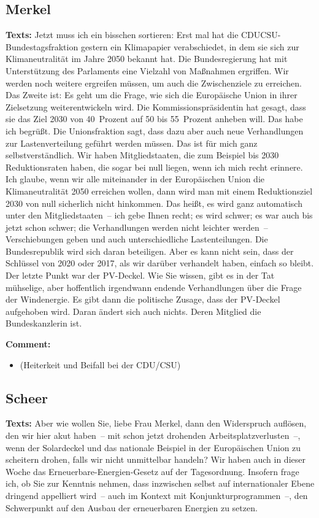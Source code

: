 \documentclass{article}
\begin{document}
\subsection{Merkel}
\noindent\textbf{Texts:} Jetzt muss ich ein bisschen sortieren: Erst mal hat die CDU\/CSU-Bundestagsfraktion gestern ein Klimapapier verabschiedet, in dem sie sich zur Klimaneutralität im Jahre 2050 bekannt hat. Die Bundesregierung hat mit Unterstützung des Parlaments eine Vielzahl von Maßnahmen ergriffen. Wir werden noch weitere ergreifen müssen, um auch die Zwischenziele zu erreichen. Das Zweite ist: Es geht um die Frage, wie sich die Europäische Union in ihrer Zielsetzung weiterentwickeln wird. Die Kommissionspräsidentin hat gesagt, dass sie das Ziel 2030 von 40 Prozent auf 50 bis 55 Prozent anheben will. Das habe ich begrüßt. Die Unionsfraktion sagt, dass dazu aber auch neue Verhandlungen zur Lastenverteilung geführt werden müssen. Das ist für mich ganz selbstverständlich. Wir haben Mitgliedstaaten, die zum Beispiel bis 2030 Reduktionsraten haben, die sogar bei null liegen, wenn ich mich recht erinnere. Ich glaube, wenn wir alle miteinander in der Europäischen Union die Klimaneutralität 2050 erreichen wollen, dann wird man mit einem Reduktionsziel 2030 von null sicherlich nicht hinkommen. Das heißt, es wird ganz automatisch unter den Mitgliedstaaten – ich gebe Ihnen recht; es wird schwer; es war auch bis jetzt schon schwer; die Verhandlungen werden nicht leichter werden – Verschiebungen geben und auch unterschiedliche Lastenteilungen. Die Bundesrepublik wird sich daran beteiligen. Aber es kann nicht sein, dass der Schlüssel von 2020 oder 2017, als wir darüber verhandelt haben, einfach so bleibt. Der letzte Punkt war der PV-Deckel. Wie Sie wissen, gibt es in der Tat mühselige, aber hoffentlich irgendwann endende Verhandlungen über die Frage der Windenergie. Es gibt dann die politische Zusage, dass der PV-Deckel aufgehoben wird. Daran ändert sich auch nichts. Deren Mitglied die Bundeskanzlerin ist. 

\noindent\textbf{Comment:}
\begin{itemize}
    \setlength\itemsep{-3pt}
    \item (Heiterkeit und Beifall bei der CDU/CSU)
\end{itemize}
\subsection{Scheer}
\noindent\textbf{Texts:} Aber wie wollen Sie, liebe Frau Merkel, dann den Widerspruch auflösen, den wir hier akut haben – mit schon jetzt drohenden Arbeitsplatzverlusten –, wenn der Solardeckel und das nationale Beispiel in der Europäischen Union zu scheitern drohen, falls wir nicht unmittelbar handeln? Wir haben auch in dieser Woche das Erneuerbare-Energien-Gesetz auf der Tagesordnung. Insofern frage ich, ob Sie zur Kenntnis nehmen, dass inzwischen selbst auf internationaler Ebene dringend appelliert wird – auch im Kontext mit Konjunkturprogrammen –, den Schwerpunkt auf den Ausbau der erneuerbaren Energien zu setzen.
\end{document}
